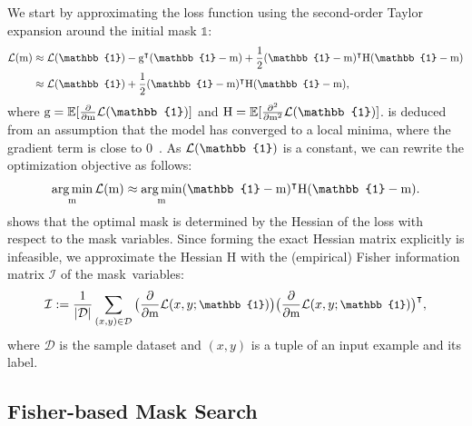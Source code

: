 We start by approximating the loss function using the second-order Taylor expansion around the initial mask  $\mathbb{1}$:
\vspace{-2mm}
\begin{align}
    \loss(\text{m}) & \approx \loss(\mathbb{1}) - \text{g}^\intercal (\mathbb{1} - \text{m}) + \frac{1}{2}(\mathbb{1} - \text{m})^\intercal \text{H} (\mathbb{1} - \text{m}) \\
    &\approx \loss(\mathbb{1}) + \frac{1}{2}(\mathbb{1} - \text{m})^\intercal \text{H} (\mathbb{1} - \text{m}) , \label{eq:lm_nograd}
\end{align}
where $\text{g} = \mathbb{E}[\frac{\partial}{\partial \text{m}} \loss(\mathbb{1})]$ and $\text{H} = \mathbb{E}[\frac{\partial^2}{\partial \text{m}^2} \loss(\mathbb{1})]$.
 is deduced from an assumption that the model has converged to a local minima, where the gradient term is close to 0~\cite{lecun1990optimal}.
As $\loss(\mathbb{1})$ is a constant, we can rewrite the optimization objective as follows:
\begin{align}
    \argmin_{\text{m}} \loss(\text{m}) 
    \approx \argmin_{\text{m}} (\mathbb{1} - \text{m})^\intercal \text{H} (\mathbb{1} - \text{m}). \label{eq:argmin_hessian}
\end{align}
 shows that the optimal mask is determined by the Hessian of the loss with respect to the mask variables.
Since forming the exact Hessian matrix explicitly is infeasible, we approximate the Hessian $\text{H}$ with the (empirical) Fisher information matrix $\mathcal{I}$ of the mask~variables:
\begin{align}
\small
    \mathcal{I} := \frac{1}{|\mathcal{D}|} \sum_{(x, y) \in \mathcal{D}} \big(\frac{\partial}{\partial \text{m}}\loss(x, y; \mathbb{1})\big) \big(\frac{\partial}{\partial \text{m}}\loss(x, y; \mathbb{1})\big)^\intercal, \label{eq:fim}
\end{align}
where $\mathcal{D}$ is the sample dataset and $(x, y)$ is a tuple of an input example and its label.

\subsection{Fisher-based Mask Search}
\label{subsec:search}

